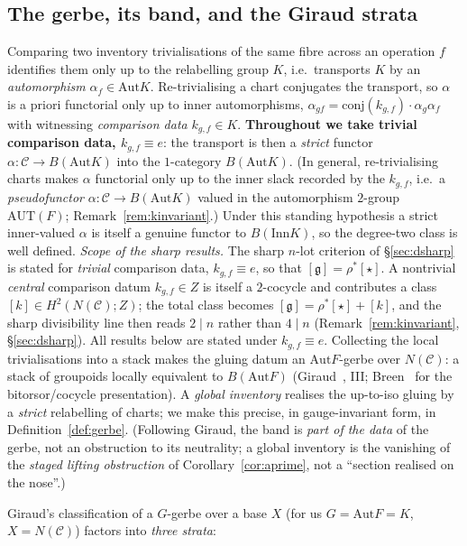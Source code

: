 \documentclass[11pt]{article}
\theoremstyle{definition}
\newcommand{\C}{\mathcal{C}}
\newcommand{\Aut}{\mathrm{Aut}}
\newcommand{\Inn}{\mathrm{Inn}}
\newcommand{\Zc}{Z}
\newcommand{\gerbe}{\mathfrak{g}}
\begin{document}
\subsection{The gerbe, its band, and the Giraud strata}\label{sec:prelim-gerbe}

Comparing two inventory trivialisations of the same fibre across an operation $f$ identifies them
only up to the relabelling group $K$, i.e.\ transports $K$ by an \emph{automorphism} $\alpha_f\in
\Aut K$. Re-trivialising a chart conjugates the transport, so $\alpha$ is a priori functorial only
up to inner automorphisms, $\alpha_{gf}=\mathrm{conj}(k_{g,f})\cdot\alpha_g\alpha_f$ with witnessing
\emph{comparison data} $k_{g,f}\in K$. \textbf{Throughout we take trivial comparison data, $k_{g,f}\equiv e$}: the transport is then a
\emph{strict} functor $\alpha:\C\to B(\Aut K)$ into the $1$-category $B(\Aut K)$. (In general,
re-trivialising charts makes $\alpha$ functorial only up to the inner slack recorded by the
$k_{g,f}$, i.e.\ a \emph{pseudofunctor} $\alpha:\C\to B(\Aut K)$ valued in the automorphism
$2$-group $\mathrm{AUT}(F)$; Remark~\ref{rem:kinvariant}.) Under this standing hypothesis a strict
inner-valued $\alpha$ is itself a genuine functor to $B(\Inn K)$, so the degree-two class is well
defined. \emph{Scope of the sharp results.} The sharp $n$-lot criterion of
\S\ref{sec:dsharp} is stated for \emph{trivial} comparison data, $k_{g,f}\equiv e$, so that
$[\gerbe]=\rho^*[\star]$. A nontrivial \emph{central} comparison datum $k_{g,f}\in\Zc$ is itself a
$2$-cocycle and contributes a class $[k]\in H^2(N(\C);\Zc)$; the total class becomes
$[\gerbe]=\rho^*[\star]+[k]$, and the sharp divisibility line then reads $2\mid n$ rather than
$4\mid n$ (Remark~\ref{rem:kinvariant}, \S\ref{sec:dsharp}). All results below are stated under
$k_{g,f}\equiv e$. Collecting the local trivialisations into a stack makes the gluing
datum an $\Aut F$-gerbe over $N(\C)$: a stack of groupoids locally equivalent to $B(\Aut F)$
(Giraud~\cite{giraud}, III; Breen~\cite{breen} for the bitorsor/cocycle presentation). A
\emph{global inventory} realises the up-to-iso gluing by a \emph{strict} relabelling of charts; we
make this precise, in gauge-invariant form, in Definition~\ref{def:gerbe}. (Following Giraud, the
band is \emph{part of the data} of the gerbe, not an obstruction to its neutrality; a global
inventory is the vanishing of the \emph{staged lifting obstruction} of
Corollary~\ref{cor:aprime}, not a ``section realised on the nose''.)

Giraud's classification of a $G$-gerbe over a base $X$ (for us $G=\Aut F=K$, $X=N(\C)$) factors
into \emph{three strata}:
\end{document}
